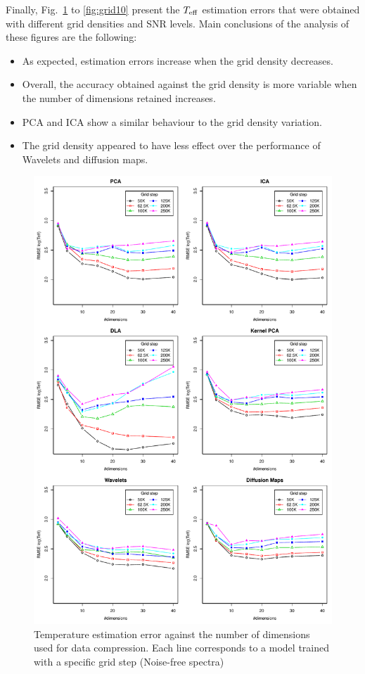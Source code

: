 \documentclass[a4paper,fleqn,usenatbib]{mnras}
\begin{document}
Finally, Fig.~\ref{fig:gridpure} to \ref{fig:grid10} present the
$T_{\rm eff}$ estimation errors that were obtained with different 
grid densities and SNR levels. Main conclusions of the analysis 
of these figures are the following:

\begin{itemize}
\item As expected, estimation errors increase when the grid 
	density decreases.
\item Overall, the accuracy obtained against the grid density 
	is more variable when the number of dimensions retained 
	increases. 
\item PCA and ICA show a similar behaviour to the grid density 
	variation. 
\item The grid density appeared to have less effect over the 
	performance of Wavelets and diffusion maps.
\end{itemize}


\begin{figure}
\centering\includegraphics[height=0.95\textheight]{bestSVM_Teff_N-RMSE_HR10_pure_all.pdf}
\caption{Temperature estimation error against the number of dimensions
  used for data compression. Each line corresponds to a model trained
  with a specific grid step (Noise-free spectra)}
\label{fig:gridpure}
\end{figure}
\end{document}
